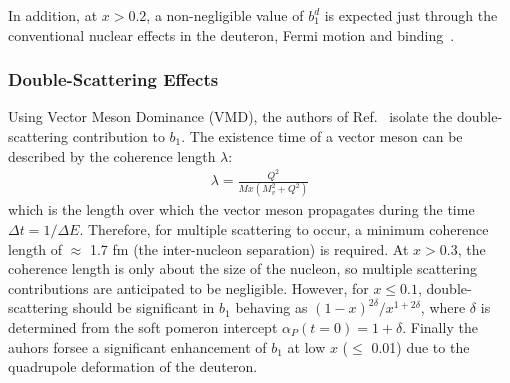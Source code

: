 In addition, at $x > 0.2$, a non-negligible value of $b_1^d$ is expected just through
the conventional nuclear effects in the deuteron, Fermi motion and binding~\cite{Khan:1991qk}.

%
\subsubsection{Double-Scattering Effects}
%
Using Vector Meson Dominance (VMD), the authors of Ref.~\cite{Bora:1997pi} isolate the 
double-scattering contribution to $b_1$. The existence time of a vector meson can 
be described by the coherence length $\lambda$: 
\begin{eqnarray}
\lambda = \frac{Q^2}{M x (M_v^2 + Q^2)}
\end{eqnarray}
which is the length over which the vector meson propagates during the time $\Delta t 
= 1/\Delta E$. Therefore, for multiple scattering to occur, a minimum coherence length 
of $\approx$ 1.7 fm (the inter-nucleon separation) is required. At 
$x > 0.3$, the coherence length is only about the size of the nucleon, so multiple 
scattering contributions are anticipated to be negligible. However, for $x \le 0.1$, 
double-scattering should be significant in $b_1$ behaving as $(1-x)^{2\delta}/x^{1+2\delta}$, 
where $\delta$ is determined from the soft pomeron intercept $\alpha_P(t=0) = 1 + \delta$.
Finally the auhors forsee a significant enhancement of $b_1$ at low $x$ ($\le$ 0.01) 
due to the quadrupole deformation of the deuteron.

